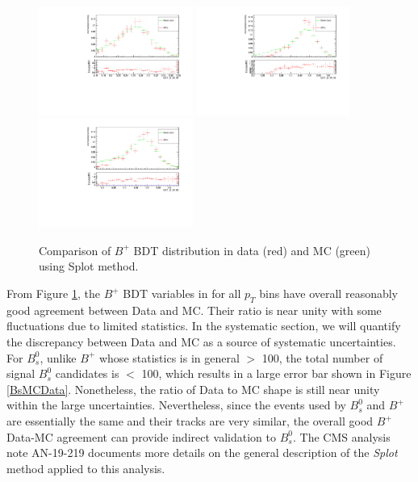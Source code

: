 \begin{figure}[h]
\begin{center}
\includegraphics[width=0.45\textwidth]{Figures/Chapter5/BDT_pt_30_40_mc_validation_Bu.pdf}
\includegraphics[width=0.45\textwidth]{Figures/Chapter5/BDT_pt_40_50_mc_validation_Bu.pdf}
\includegraphics[width=0.45\textwidth]{Figures/Chapter5/BDT_pt_50_60_mc_validation_Bu.pdf}
\caption{Comparison of $B^+$ BDT distribution in data (red) and MC (green) using Splot method.}
\label{BPMCData}
\end{center}
\end{figure}

From Figure \ref{BPMCData}, the $B^+$ BDT variables in for all $p_T$ bins have overall reasonably good agreement between Data and MC. Their ratio is near unity with some fluctuations due to limited statistics. In the systematic section, we will quantify the discrepancy between Data and MC as a source of systematic uncertainties. For $B^0_s$, unlike $B^+$ whose statistics is in general $>$ 100, the total number of signal $B^0_s$ candidates is $<$ 100, which results in a large error bar shown in Figure \ref{BsMCData}. Nonetheless, the ratio of Data to MC shape is still near unity within the large uncertainties. Nevertheless, since the events used by $B^0_s$ and $B^+$ are essentially the same and their tracks are very similar, the overall good $B^+$ Data-MC agreement can provide indirect validation to $B^0_s$. The CMS analysis note AN-19-219 \cite{AN-19-219} documents more details on the general description of the \textit{Splot} method applied to this analysis.  


